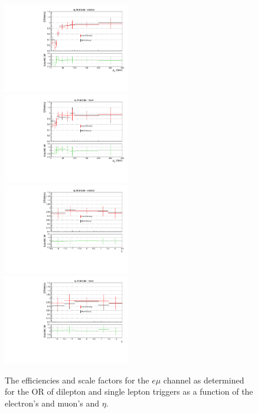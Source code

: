\begin{figure}[ht]
\centering
\includegraphics[width=0.495\textwidth]{figs/background-estimation/triggerEfficiency/ttbar/muonElectron1_pT_SF_alt.pdf}
\includegraphics[width=0.495\textwidth]{figs/background-estimation/triggerEfficiency/ttbar/muonElectron2_pT_SF_alt.pdf}
\\
\includegraphics[width=0.495\textwidth]{figs/background-estimation/triggerEfficiency/ttbar/muonElectron1_eta_SF_alt.pdf}
\includegraphics[width=0.495\textwidth]{figs/background-estimation/triggerEfficiency/ttbar/muonElectron2_eta_SF_alt.pdf}
\caption{
The efficiencies and scale factors for the $e\mu$ channel as determined for the OR of dilepton and single lepton triggers as a function of the electron's and muon's \pT and $\eta$.
}
\label{fig:App_trigEff_emu}
\end{figure}

